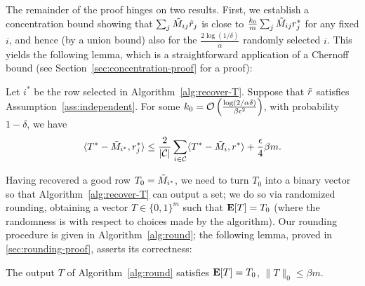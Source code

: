The remainder of the proof hinges on two results. First, we establish 
a concentration bound showing that $\sum_j \tilde{M}_{ij}\tilde{r}_j$ is close to 
$\frac{k_0}{m}\sum_j \tilde{M}_{ij}r^*_j$ for any fixed $i$, and hence (by a union bound) 
also for the $\frac{2\log(1/\delta)}{\alpha}$ randomly selected $i$. 
This yields the following lemma, which is a straightforward 
application of a Chernoff bound (see Section~\ref{sec:concentration-proof} for a proof):
\begin{lemma}
\label{lem:robs-rtrue}
Let $i^*$ be the row selected in Algorithm~\ref{alg:recover-T}. 
Suppose that $\tilde{r}$ satisfies Assumption~\ref{ass:independent}. 
For some 
$k_0 = \mathcal{O}\left( \frac{\log(2/\alpha\delta)}{\beta\epsilon^2} \right)$, 
with probability $1-\delta$, we have
\vskip -0.15in
\begin{equation}
\label{eq:robs-rtrue}
\langle T^*-\tilde{M}_{i^*}, r^*_j \rangle \leq \frac{2}{|\mathcal{C}|} \sum_{i \in \mathcal{C}} \langle T^* - \tilde{M}_i, r^* \rangle + \frac{\epsilon}{4}\beta m.
\end{equation}
\end{lemma}
\vskip -0.1in

Having recovered a good row $T_0 = \tilde{M}_{i^*}$, 
we need to turn $T_0$ into a binary vector so that 
Algorithm~\ref{alg:recover-T} can output a set;
we do so via randomized rounding, obtaining a vector $T \in \{0,1\}^m$ such that 
$\mathbf{E}[T] = T_0$ (where the randomness is with respect to choices made by the algorithm).
Our rounding procedure is given in Algorithm~\ref{alg:round}; the following 
lemma, proved in \ref{sec:rounding-proof}, asserts its correctness:
\begin{lemma}
\label{lem:rounding}
The output $T$ of Algorithm~\ref{alg:round} satisfies $\mathbf{E}[T] = T_0$, 
$\|T\|_0 \leq \beta m$.
\end{lemma}



